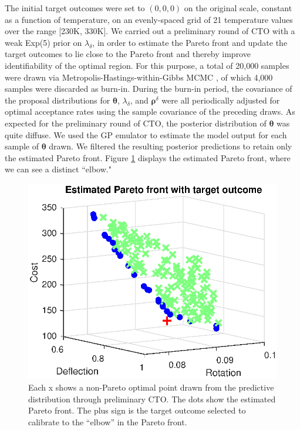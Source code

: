 \documentclass[12pt]{article}
\begin{document}
The initial target outcomes were set to $(0,0,0)$ on the original scale, constant as a function of temperature, on an evenly-spaced grid of 21 temperature values over the range [230K, 330K].
%
We carried out a preliminary round of CTO with a weak Exp(5) prior on $\lambda_\delta$, in order to estimate the Pareto front and update the target outcomes to lie close to the Pareto front and thereby improve identifiability of the optimal region.
%
For this purpose, a total of 20,000 samples were drawn via Metropolis-Hastings-within-Gibbs MCMC \citep{Metropolis1953, Hastings1970, Geman1984}, of which 4,000 samples were discarded as burn-in. 
%
During the burn-in period, the covariance of the proposal distributions for $\boldsymbol \theta$, $\lambda_\delta$, and $\boldsymbol\rho^\delta$ were all periodically adjusted for optimal acceptance rates using the sample covariance of the preceding draws.
%
%
%
As expected for the preliminary round of CTO, the posterior distribution of $\boldsymbol\theta$ was quite diffuse.
%
We used the GP emulator to estimate the model output for each sample of $\boldsymbol \theta$ drawn.
%
We filtered the resulting posterior predictions to retain only the estimated Pareto front.
%
Figure \ref{fig:elbow} displays the estimated Pareto front, where we can see a distinct ``elbow."
%
\begin{figure}
\centering
\includegraphics[scale=0.8]{FIG_est_PF_with_des_obs.eps}
\caption{Each x shows a non-Pareto optimal point drawn from the predictive distribution through preliminary CTO. The dots show the estimated Pareto front. The plus sign is the target outcome selected to calibrate to the ``elbow'' in the Pareto front.}
\label{fig:elbow}
\end{figure}
\end{document}
